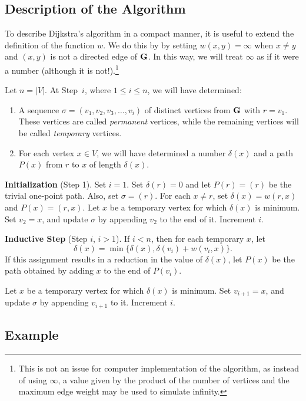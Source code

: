 \subsection{Description of the Algorithm}

To describe Dijkstra's algorithm in a compact manner, it is useful to
extend the definition of the function $w$. We do this by by setting
$w(x,y)=\infty$ when $x\neq y$ and $(x,y)$ is not a directed edge of
$\mathbf{G}$. In this way, we will treat $\infty$ as if it were a number
(although it is not!).\footnote{This is not an issue for computer
  implementation of the algorithm, as instead of using $\infty$, a
  value given by the product of the number of vertices and the 
  maximum edge weight may be used to simulate infinity.} 

Let $n=|V|$.  At Step~$i$, where $1\le i\le n$, we will 
have determined: 
\begin{enumerate}
\item A sequence $\sigma=(v_1,v_2,v_3,\dots,v_i)$ of distinct 
vertices from $\mathbf{G}$ with $r=v_1$.  These vertices are called 
\textit{permanent} vertices, while the remaining vertices will
be called \textit{temporary} vertices.
\item For each vertex $x\in V$, we will have determined a
  number $\delta(x)$ and a path $P(x)$ from $r$ to $x$ of
  length $\delta(x)$.
\end{enumerate}

\noindent\textbf{Initialization} (Step 1).\quad
Set $i=1$. Set $\delta(r)=0$ and let $P(r)=(r)$ be the trivial
one-point path.  Also, set $\sigma= (r)$.  For each $x\neq r$, set
$\delta(x)= w(r,x)$ and $P(x)=(r,x)$. Let $x$ be a temporary vertex
for which $\delta(x)$ is minimum. Set $v_2 = x$, and update $\sigma$
by appending $v_2$ to the end of it. Increment $i$.

\medskip
\noindent\textbf{Inductive Step} (Step $i$, $i>1$).\quad
If $i<n$, then
for each temporary $x$, let
\[\delta(x) = \min\{\delta(x), \delta(v_i)+w(v_i,x)\}.\]
If this assignment results in a reduction in the
value of $\delta(x)$, let $P(x)$ be the
path obtained by adding $x$ to the end of $P(v_i)$.

Let $x$ be a temporary vertex for which $\delta(x)$ is minimum.  Set
$v_{i+1}=x$, and update $\sigma$ by appending $v_{i+1}$ to
it. Increment $i$.

\subsection{Example}

